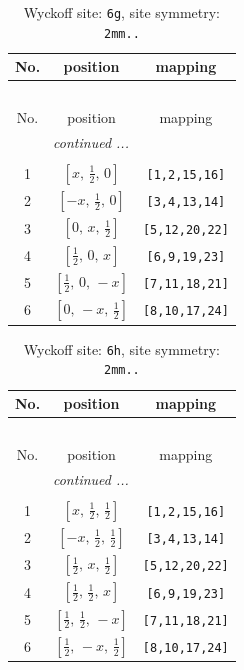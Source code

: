 \documentclass[fleqn,8pt]{jsarticle}
\begin{document}
\renewcommand{\arraystretch}{1.2}
\begin{longtable}{ccc}
\caption{Wyckoff site: {\tt 6g}, site symmetry: {\tt 2mm..}}
 \\
 \hline \hline
No. & position & mapping \\ \hline \endfirsthead

\multicolumn{2}{l}{\tablename\ \thetable{}} \\
 \hline \hline
No. & position & mapping \\ \hline \endhead

 \hline \hline
\multicolumn{2}{r}{\footnotesize\it continued ...} \\ \endfoot

 \hline \hline
\multicolumn{2}{r}{} \\ \endlastfoot

1 & $\left[ x,\, \frac{1}{2},\, 0 \right]$ & {\tt [1,2,15,16]} \\ \hline
2 & $\left[ - x,\, \frac{1}{2},\, 0 \right]$ & {\tt [3,4,13,14]} \\ \hline
3 & $\left[ 0,\, x,\, \frac{1}{2} \right]$ & {\tt [5,12,20,22]} \\ \hline
4 & $\left[ \frac{1}{2},\, 0,\, x \right]$ & {\tt [6,9,19,23]} \\ \hline
5 & $\left[ \frac{1}{2},\, 0,\, - x \right]$ & {\tt [7,11,18,21]} \\ \hline
6 & $\left[ 0,\, - x,\, \frac{1}{2} \right]$ & {\tt [8,10,17,24]} \\
\end{longtable}
\renewcommand{\arraystretch}{1.2}
\begin{longtable}{ccc}
\caption{Wyckoff site: {\tt 6h}, site symmetry: {\tt 2mm..}}
 \\
 \hline \hline
No. & position & mapping \\ \hline \endfirsthead

\multicolumn{2}{l}{\tablename\ \thetable{}} \\
 \hline \hline
No. & position & mapping \\ \hline \endhead

 \hline \hline
\multicolumn{2}{r}{\footnotesize\it continued ...} \\ \endfoot

 \hline \hline
\multicolumn{2}{r}{} \\ \endlastfoot

1 & $\left[ x,\, \frac{1}{2},\, \frac{1}{2} \right]$ & {\tt [1,2,15,16]} \\ \hline
2 & $\left[ - x,\, \frac{1}{2},\, \frac{1}{2} \right]$ & {\tt [3,4,13,14]} \\ \hline
3 & $\left[ \frac{1}{2},\, x,\, \frac{1}{2} \right]$ & {\tt [5,12,20,22]} \\ \hline
4 & $\left[ \frac{1}{2},\, \frac{1}{2},\, x \right]$ & {\tt [6,9,19,23]} \\ \hline
5 & $\left[ \frac{1}{2},\, \frac{1}{2},\, - x \right]$ & {\tt [7,11,18,21]} \\ \hline
6 & $\left[ \frac{1}{2},\, - x,\, \frac{1}{2} \right]$ & {\tt [8,10,17,24]} \\
\end{longtable}
\end{document}
